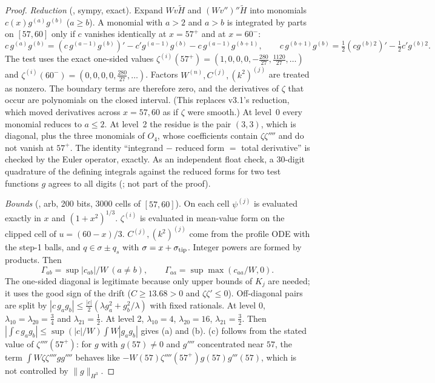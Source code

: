 \documentclass[11pt]{article}
\newcommand{\fn}[1]{\texttt{\detokenize{#1}}}\newcommand{\key}[1]{\texttt{\detokenize{#1}}}
\begin{document}
\begin{proof}
\emph{Reduction} (\fn{flux_reduce.py}, sympy, exact). Expand $W v\tilde H$ and $(Wv'')''\tilde H$ into monomials $c(x)g^{(a)}g^{(b)}$ ($a\ge b$). A monomial with $a>2$ and $a>b$ is integrated by parts on $[57,60]$ only if $c$ vanishes identically at $x=57^+$ and at $x=60^-$:
\[c\,g^{(a)}g^{(b)}=(c\,g^{(a-1)}g^{(b)})'-c'g^{(a-1)}g^{(b)}-c\,g^{(a-1)}g^{(b+1)},\qquad c\,g^{(b+1)}g^{(b)}=\tfrac12(cg^{(b)2})'-\tfrac12c'g^{(b)2}.\]
The test uses the exact one-sided values $\zeta^{(i)}(57^+)=(1,0,0,0,-\frac{280}{27},\frac{1120}{27},\dots)$ and $\zeta^{(i)}(60^-)=(0,0,0,0,\frac{280}{27},\dots)$. Factors $W^{(n)},C^{(j)},(k^2)^{(j)}$ are treated as nonzero. The boundary terms are therefore zero, and the derivatives of $\zeta$ that occur are polynomials on the closed interval. (This replaces v3.1's reduction, which moved derivatives across $x=57,60$ as if $\zeta$ were smooth.) At level~0 every monomial reduces to $a\le2$. At level~2 the residue is the pair $(3,3)$, which is diagonal, plus the three monomials of $O_4$, whose coefficients contain $\zeta\zeta''''$ and do not vanish at $57^+$. The identity ``integrand $-$ reduced form $=$ total derivative'' is checked by the Euler operator, exactly. As an independent float check, a 30-digit quadrature of the defining integrals against the reduced forms for two test functions $g$ agrees to all digits (\fn{sanity_quad.json}; not part of the proof).

\emph{Bounds} (\fn{flux_cert.py}, arb, 200 bits, 3000 cells of $[57,60]$). On each cell $\psi^{(j)}$ is evaluated exactly in $x$ and $(1+x^2)^{1/3}$. $\zeta^{(i)}$ is evaluated in mean-value form on the clipped cell of $u=(60-x)/3$. $C^{(j)},(k^2)^{(j)}$ come from the profile ODE with the step-1 balls, and $q\in\sigma\pm q_s$ with $\sigma=x+\sigma_{\rm tip}$. Integer powers are formed by products. Then
\[\Gamma_{ab}=\sup|c_{ab}|/W\ (a\neq b),\qquad\Gamma_{aa}=\sup\max(c_{aa}/W,0).\]
The one-sided diagonal is legitimate because only upper bounds of $K_j$ are needed; it uses the good sign of the drift ($C\ge13.68>0$ and $\zeta\zeta'\le0$). Off-diagonal pairs are split by $|c\,g_ag_b|\le\frac{|c|}2(\lambda g_a^2+g_b^2/\lambda)$ with fixed rationals. At level 0, $\lambda_{10}=\lambda_{20}=\frac34$ and $\lambda_{21}=\frac12$. At level 2, $\lambda_{10}=4$, $\lambda_{20}=16$, $\lambda_{21}=\frac32$. Then $|\int c\,g_ag_b|\le\sup(|c|/W)\int W|g_ag_b|$ gives (a) and (b). (c) follows from the stated value of $\zeta''''(57^+)$: for $g$ with $g(57)\ne0$ and $g''''$ concentrated near $57$, the term $\int W\zeta\zeta''''gg''''$ behaves like $-W(57)\zeta''''(57^+)g(57)g'''(57)$, which is not controlled by $\|g\|_{H^3}$.
\end{proof}
\end{document}
